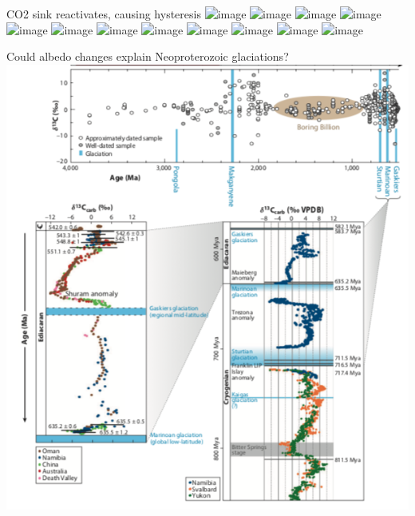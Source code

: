 \documentclass[11pt]{beamer}
\begin{document}
\begin{frame}{CO2 sink reactivates, causing hysteresis}
    \centering
    \includegraphics<1 >[width=.9\textwidth,height=.9\textheight,keepaspectratio]{img/Bback_0.png}
    \includegraphics<2 >[width=.9\textwidth,height=.9\textheight,keepaspectratio]{img/Bback_1.png}
    \includegraphics<3 >[width=.9\textwidth,height=.9\textheight,keepaspectratio]{img/Bback_2.png}
    \includegraphics<4 >[width=.9\textwidth,height=.9\textheight,keepaspectratio]{img/Bback_3.png}
    \includegraphics<5 >[width=.9\textwidth,height=.9\textheight,keepaspectratio]{img/Bback_4.png}
    \includegraphics<6 >[width=.9\textwidth,height=.9\textheight,keepaspectratio]{img/Bback_5.png}
    \includegraphics<7 >[width=.9\textwidth,height=.9\textheight,keepaspectratio]{img/Bfor_0.png}
    \includegraphics<8 >[width=.9\textwidth,height=.9\textheight,keepaspectratio]{img/Bfor_1.png}
    \includegraphics<9 >[width=.9\textwidth,height=.9\textheight,keepaspectratio]{img/Bfor_2.png}
    \includegraphics<10>[width=.9\textwidth,height=.9\textheight,keepaspectratio]{img/Bfor_3.png}
    \includegraphics<11>[width=.9\textwidth,height=.9\textheight,keepaspectratio]{img/Bfor_4.png}
    \includegraphics<12>[width=.9\textwidth,height=.9\textheight,keepaspectratio]{img/Bfor_5.png}
\end{frame}

\begin{frame}{Could albedo changes explain Neoproterozoic glaciations?}
    \centering
    \includegraphics[width=.9\textwidth,height=.9\textheight,keepaspectratio]{img/pierrehumbert.png}
\end{frame}
\end{document}
